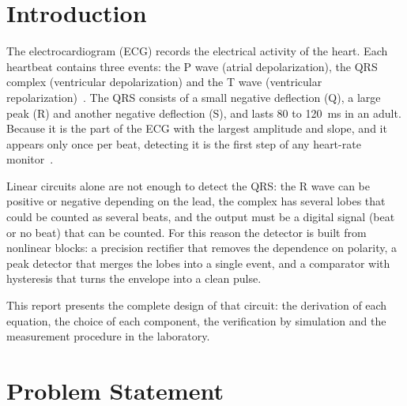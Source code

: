 \documentclass[11pt,letterpaper]{article}
\begin{document}
\newpage
\tableofcontents
\newpage
\listoffigures
\listoftables
\newpage

\section{Introduction}

The electrocardiogram (ECG) records the electrical activity of the heart. Each heartbeat contains three events: the P wave (atrial depolarization), the QRS complex (ventricular depolarization) and the T wave (ventricular repolarization)~\cite{guyton}. The QRS consists of a small negative deflection (Q), a large peak (R) and another negative deflection (S), and lasts 80 to \SI{120}{ms} in an adult. Because it is the part of the ECG with the largest amplitude and slope, and it appears only once per beat, detecting it is the first step of any heart-rate monitor~\cite{pantompkins}.

Linear circuits alone are not enough to detect the QRS: the R wave can be positive or negative depending on the lead, the complex has several lobes that could be counted as several beats, and the output must be a digital signal (beat or no beat) that can be counted. For this reason the detector is built from nonlinear blocks: a precision rectifier that removes the dependence on polarity, a peak detector that merges the lobes into a single event, and a comparator with hysteresis that turns the envelope into a clean pulse.

This report presents the complete design of that circuit: the derivation of each equation, the choice of each component, the verification by simulation and the measurement procedure in the laboratory.

\section{Problem Statement}

\begin{center}
\end{center}
\end{document}

